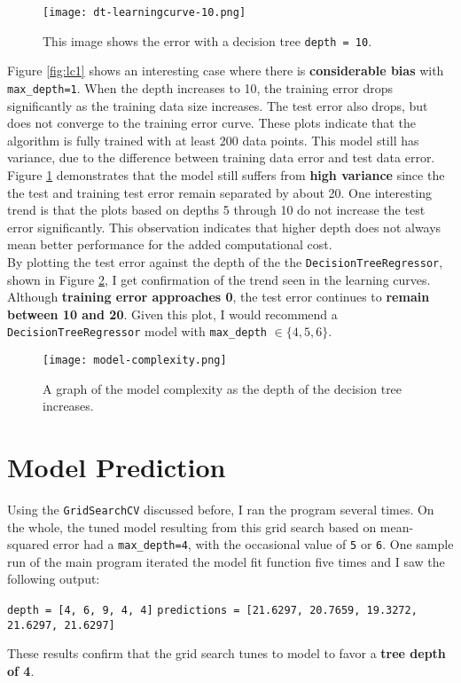 \documentclass[12pt,letterpaper]{article}
\begin{document}
\begin{figure}[h!]
	\centering
	\texttt{[image: dt-learningcurve-10.png]}
	\caption{This image shows the error with a decision tree \texttt{depth = 10}.}
	\label{fig:lc10}
\end{figure}

Figure \ref{fig:lc1} shows an interesting case where there is {\bf considerable bias} with \verb|max_depth=1|.
When the depth increases to 10, the training error drops significantly as the training data size increases.
The test error also drops, but does not converge to the training error curve.
These plots indicate that the algorithm is fully trained with at least 200 data points.
This model still has variance, due to the difference between training data error and test data error.
Figure \ref{fig:lc10} demonstrates that the model still suffers from {\bf high variance} since the the test and training test error remain separated by about 20.
One interesting trend is that the plots based on depths 5 through 10 do not increase the test error significantly.
This observation indicates that higher depth does not always mean better performance for the added computational cost. \\


By plotting the test error against the depth of the the \verb|DecisionTreeRegressor|, shown in Figure \ref{fig:mc}, I get confirmation of the trend seen in the learning curves.
Although {\bf training error approaches 0}, the test error continues to {\bf remain between 10 and 20}.
Given this plot, I would recommend a \verb|DecisionTreeRegressor| model with \verb|max_depth| $\in \{4,5,6\}$.

\begin{figure}[h!]
	\centering
	\texttt{[image: model-complexity.png]}
	\caption{A graph of the model complexity as the depth of the decision tree increases.}
	\label{fig:mc}
\end{figure}

\section*{Model Prediction}

Using the \verb|GridSearchCV| discussed before, I ran the program several times.
On the whole, the tuned model resulting from this grid search based on mean-squared error had a \verb|max_depth=4|, with the occasional value of \verb|5| or \verb|6|.
One sample run of the main program iterated the model fit function five times and I saw the following output:
\begin{center}
	\verb|depth = [4, 6, 9, 4, 4]|
	\verb|predictions = [21.6297, 20.7659, 19.3272, 21.6297, 21.6297]|
\end{center}
These results confirm that the grid search tunes to model to favor a {\bf tree depth of 4}. \\
\end{document}
